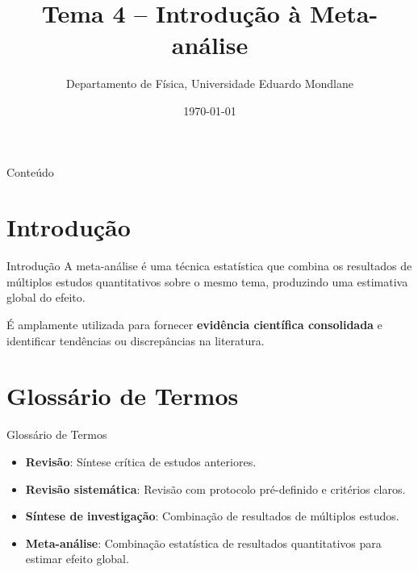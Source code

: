 \documentclass[12pt]{beamer}
\title{Tema 4 – Introdução à Meta-análise}
\author{Departamento de Física, Universidade Eduardo Mondlane}
\date{\today}
\begin{document}
\frame{\titlepage}

\begin{frame}{Conteúdo}
\tableofcontents
\end{frame}

\section{Introdução}
\begin{frame}{Introdução}
A meta-análise é uma técnica estatística que combina os resultados de múltiplos estudos quantitativos sobre o mesmo tema, produzindo uma estimativa global do efeito. 

É amplamente utilizada para fornecer \textbf{evidência científica consolidada} e identificar tendências ou discrepâncias na literatura.
\end{frame}

\section{Glossário de Termos}
\begin{frame}{Glossário de Termos}
\begin{itemize}
    \item \textbf{Revisão}: Síntese crítica de estudos anteriores.
    \item \textbf{Revisão sistemática}: Revisão com protocolo pré-definido e critérios claros.
    \item \textbf{Síntese de investigação}: Combinação de resultados de múltiplos estudos.
    \item \textbf{Meta-análise}: Combinação estatística de resultados quantitativos para estimar efeito global.
\end{itemize}
\end{frame}

\end{document}
